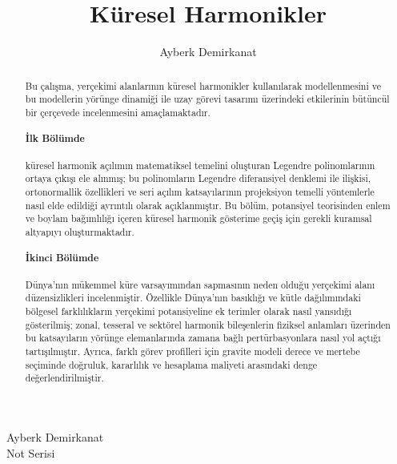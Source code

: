 \documentclass[12pt, a4paper]{book}
\author{Ayberk Demirkanat}
\title{\textbf{Küresel Harmonikler}}
\date{}
\begin{document}
\begin{titlepage}
    \CoverBackground

    \vspace*{0.92\textheight}

    \begin{center}
        {\textcolor{white!80!yellow!10}{\large Ayberk Demirkanat \\ Not Serisi}}
    \end{center}

\end{titlepage}

\ClearShipoutPictureBG



\begin{abstract}
Bu çalışma, yerçekimi alanlarının küresel harmonikler kullanılarak modellenmesini ve bu
modellerin yörünge dinamiği ile uzay görevi tasarımı üzerindeki etkilerinin bütüncül bir
çerçevede incelenmesini amaçlamaktadır.

\paragraph{İlk Bölümde} küresel harmonik açılımın matematiksel temelini oluşturan Legendre
polinomlarının ortaya çıkışı ele alınmış; bu polinomların Legendre diferansiyel denklemi ile
ilişkisi, ortonormallik özellikleri ve seri açılım katsayılarının projeksiyon temelli yöntemlerle
nasıl elde edildiği ayrıntılı olarak açıklanmıştır. Bu bölüm, potansiyel teorisinden enlem ve
boylam bağımlılığı içeren küresel harmonik gösterime geçiş için gerekli kuramsal altyapıyı
oluşturmaktadır.

\paragraph{İkinci Bölümde} Dünya’nın mükemmel küre varsayımından sapmasının neden olduğu
yerçekimi alanı düzensizlikleri incelenmiştir. Özellikle Dünya’nın basıklığı ve kütle
dağılımındaki bölgesel farklılıkların yerçekimi potansiyeline ek terimler olarak nasıl yansıdığı
gösterilmiş; zonal, tesseral ve sektörel harmonik bileşenlerin fiziksel anlamları üzerinden bu
katsayıların yörünge elemanlarında zamana bağlı pertürbasyonlara nasıl yol açtığı
tartışılmıştır. Ayrıca, farklı görev profilleri için gravite modeli derece ve mertebe seçiminde
doğruluk, kararlılık ve hesaplama maliyeti arasındaki denge değerlendirilmiştir.


\end{abstract}
\end{document}
